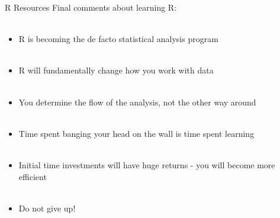 \documentclass[xcolor=svgnames]{beamer}\usepackage[]{graphicx}\usepackage[]{color}
\begin{document}
\begin{frame}[t]{R Resources}
Final comments about learning R:\\~\\
\begin{itemize}
\item R is becoming the de facto statistical analysis program \\~\\
\item R will fundamentally change how you work with data \\~\\
\item You determine the flow of the analysis, not the other way around \\~\\
\item Time spent banging your head on the wall is time spent learning \\~\\
\item Initial time investments will have huge returns - you will become more efficient \\~\\
\item Do not give up!
\end{itemize}
\end{frame}
\end{document}
